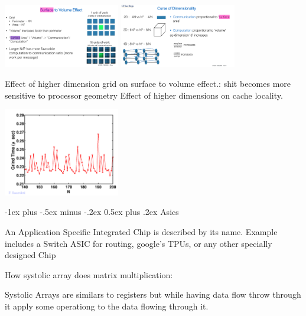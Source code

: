 \documentclass[letter,8pt,landscape]{article}
\makeatletter
\renewcommand{\section}{\@startsection{section}{1}{0mm}%
                                {-1ex plus -.5ex minus -.2ex}%
                                {0.5ex plus .2ex}%
                                {\normalfont\large\bfseries}}
\makeatother
\begin{document}
\begin{multicols}{3}
  \begin{center}
    \includegraphics[width=2in]{images/surface-2-vol.jpg}
    \includegraphics[width=2in]{images/dimentionality.jpg}
  \end{center}
  Effect of higher dimension grid on surface to volume effect.: shit becomes
  more sensitive to processor geometry
  Effect of higher dimensions on cache locality.
  \begin{center}
    \includegraphics[width=2in]{images/sensitivity.jpg}
  \end{center}

  \section{Asics}


  An Application Specific Integrated Chip is described by its name. Example includes a Switch ASIC for routing, google's TPUs, or any other specially designed Chip

  How systolic array does matrix multiplication:

  Systolic Arrays are similars to registers but while having data flow throw through it apply some operationg to the data flowing through it. 


\end{multicols}
\end{document}
